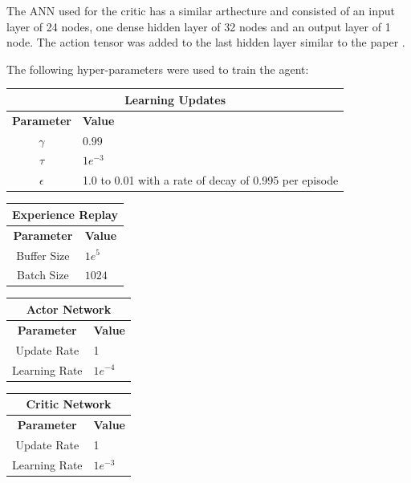\documentclass[12pt]{article}
\begin{document}
The ANN used for the critic has a similar arthecture and consisted of an input layer of 24 nodes, one dense hidden layer of 32 nodes and an output layer of 1 node. 
The action tensor was added to the last hidden layer similar to the paper \cite{ddpg_paper}.

The following hyper-parameters were used to train the agent:

\begin{table}[h!t]
\begin{center}
\begin{tabular}{|c|l|}
	\hline
	\multicolumn{2}{|c|}{\textbf{Learning Updates}}\\
	\hline
	\hline
	\textbf{Parameter} & \textbf{Value}\\
	\hline
	$\gamma$ & $0.99$\\
	$\tau$ & $1e^{-3}$\\
	$\epsilon$ & 1.0 to 0.01 with a rate of decay of 0.995 per episode\\
	\hline
\end{tabular}
\end{center}
\end{table}

\begin{table}
\begin{center}
\begin{minipage}{.3\linewidth}
\begin{tabular}{|c|l|}
	\hline
	\multicolumn{2}{|c|}{\textbf{Experience Replay}}\\
	\hline
	\hline
	\textbf{Parameter} & \textbf{Value}\\
	\hline
	Buffer Size & $1e^{5}$\\
	Batch Size & $1024$\\
	\hline
\end{tabular}
\end{minipage}
\begin{minipage}{.3\linewidth}
\begin{tabular}{|c|l|}
	\hline
	\multicolumn{2}{|c|}{\textbf{Actor Network}}\\
	\hline
	\hline
	\textbf{Parameter} & \textbf{Value}\\
	\hline
		Update Rate & 1 \\
		Learning Rate & $1e^{-4}$ \\
	\hline
\end{tabular}
\end{minipage}
\begin{minipage}{.3\linewidth}
\begin{tabular}{|c|l|}
	\hline
	\multicolumn{2}{|c|}{\textbf{Critic Network}}\\
	\hline
	\hline
	\textbf{Parameter} & \textbf{Value}\\
	\hline
		Update Rate & 1 \\
		Learning Rate & $1e^{-3}$ \\
	\hline
\end{tabular}
\end{minipage}
\end{center}
\end{table}
\end{document}

